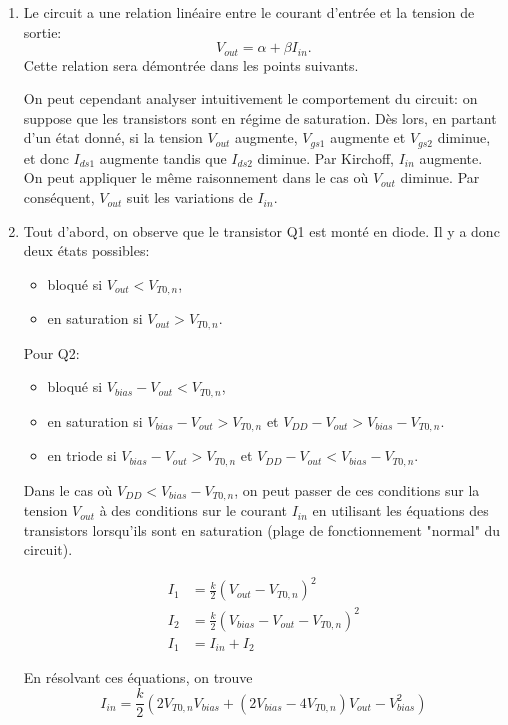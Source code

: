 \begin{enumerate}
	\item Le circuit a une relation linéaire entre le courant d'entrée et la tension de sortie:
	\[V_{out} = \alpha + \beta I_{in}.\]
	Cette relation sera démontrée dans les points suivants.

	On peut cependant analyser intuitivement le comportement du circuit: on suppose que les
	transistors sont en régime de saturation. Dès lors, en partant d'un état donné, si la tension
	$V_{out}$ augmente, $V_{gs1}$ augmente et $V_{gs2}$ diminue, et donc $I_{ds1}$ augmente tandis
	que $I_{ds2}$ diminue. Par Kirchoff, $I_{in}$ augmente.
	On peut appliquer le même raisonnement dans le cas où $V_{out}$ diminue. Par conséquent,
	$V_{out}$ suit les variations de $I_{in}$.
	
	\item Tout d'abord, on observe que le transistor Q1 est monté en diode. Il y a donc deux états
	possibles:
	\begin{itemize}
		\item bloqué si $V_{out} < V_{T0,n}$,
		\item en saturation si $V_{out} > V_{T0,n}$.
	\end{itemize}

	Pour Q2:
	\begin{itemize}
		\item bloqué si $V_{bias} - V_{out} < V_{T0,n}$,
		\item en saturation si $V_{bias} - V_{out} > V_{T0,n}$ et $V_{DD} - V_{out} > V_{bias} -
		V_{T0,n}$.
		\item en triode si $V_{bias} - V_{out} > V_{T0,n}$ et $V_{DD} - V_{out} < V_{bias} - V_{T0,n}$.
	\end{itemize}

	Dans le cas où $V_{DD} < V_{bias} - V_{T0,n}$, on peut passer de ces conditions sur la tension
	$V_{out}$ à des conditions sur le courant $I_{in}$ en utilisant les équations des transistors
	lorsqu'ils sont en saturation (plage de fonctionnement "normal" du circuit).

	\begin{align*}
    	I_1 &= \frac{k}{2}\left(V_{out} - V_{T0,n}\right)^2 \\
    	I_2 &= \frac{k}{2}\left(V_{bias} - V_{out} - V_{T0,n}\right)^2 \\
    	I_{1} &= I_{in} + I_{2}
	\end{align*}
    
	En résolvant ces équations, on trouve
	\[I_{in} = \frac{k}{2}\left(2 V_{T0,n} V_{bias} + (2 V_{bias} - 4 V_{T0,n}) V_{out} - V_{bias}
	^2\right)\]


\end{enumerate}

